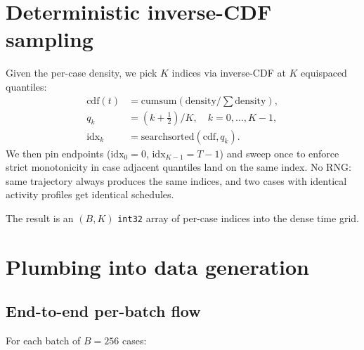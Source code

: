 \documentclass[11pt]{article}
\begin{document}
\section{Deterministic inverse-CDF sampling}

Given the per-case density, we pick $K$ indices via inverse-CDF at $K$
equispaced quantiles:
\begin{align}
  \mathrm{cdf}(t) &= \mathrm{cumsum}(\mathrm{density} / \textstyle\sum \mathrm{density}), \\
  q_k &= (k + \tfrac{1}{2}) / K, \quad k = 0, \ldots, K-1, \\
  \mathrm{idx}_k &= \mathrm{searchsorted}(\mathrm{cdf}, q_k).
\end{align}
We then pin endpoints ($\mathrm{idx}_0 = 0$, $\mathrm{idx}_{K-1} = T-1$) and
sweep once to enforce strict monotonicity in case adjacent quantiles land on
the same index. No RNG: same trajectory always produces the same indices, and
two cases with identical activity profiles get identical schedules.

The result is an $(B, K)$ \texttt{int32} array of per-case indices into the
dense time grid.

\section{Plumbing into data generation}

\subsection{End-to-end per-batch flow}

For each batch of $B = 256$ cases:
\end{document}
